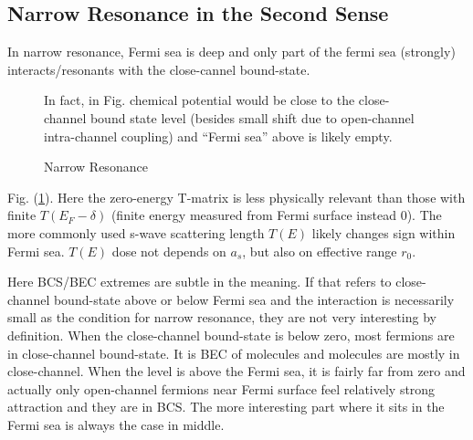 \documentclass{article}
\begin{document}
\subsection{Narrow Resonance in the Second Sense}
In narrow resonance, Fermi sea is deep and only part of the fermi sea (strongly) interacts/resonants with the close-cannel bound-state.   
\begin{figure}[hhtb]
	\centering
	         \quad
		\quad
	{\caption{Narrow Resonance\label{fig:narrowFR}}
	\parbox{0.7\textwidth}{\small{In fact, in Fig.  chemical potential would be close to the close-channel bound state level (besides small shift due to open-channel intra-channel coupling) and ``Fermi sea'' above is likely empty. }}}
\end{figure}
Fig. (\ref{fig:narrowFR}).  Here the zero-energy T-matrix is less  physically relevant than those with finite $T(E_{F}-\delta)$ (finite energy measured from Fermi surface instead 0).  The more commonly used s-wave scattering length $T(E)$ likely changes sign within Fermi sea.  $T(E)$ dose not depends on $a_{s}$, but also on effective range $r_{0}$.  

Here BCS/BEC extremes are subtle in the meaning.  If that refers to close-channel bound-state above or below Fermi sea and the interaction is necessarily small as the condition for narrow resonance, they are not very interesting by definition.  When the close-channel bound-state is below zero, most fermions are in close-channel bound-state.  It is BEC of molecules and molecules are mostly in close-channel. When the level is above the Fermi sea, it is fairly far from zero and actually only open-channel fermions near Fermi surface feel relatively strong attraction and they are in BCS.  The more interesting part where it sits in the Fermi sea is always the  case in middle.  
\end{document}
